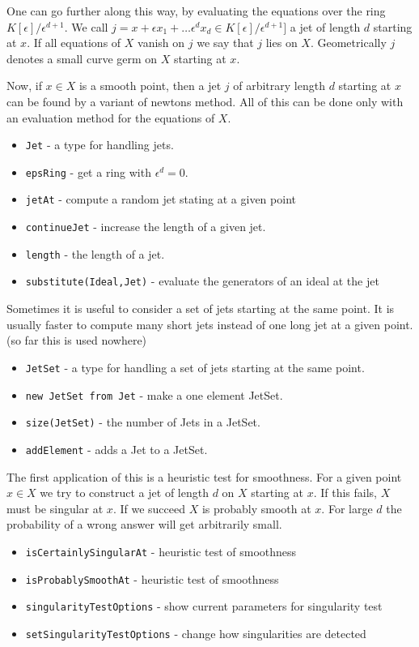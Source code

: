 \documentclass[12pt,a4paper]{amsart}
\theoremstyle{plain}
\theoremstyle{definition}
\begin{document}
One can go further along this way, by evaluating the equations over the ring $K[\epsilon]/\epsilon^{d+1}$. 
We call $j = x + \epsilon x_1 + \dots \epsilon^d x_d \in K[\epsilon]/\epsilon^{d+1}]$ a jet of length $d$ starting at $x$. 
If all equations of $X$ vanish on $j$ we say that $j$ lies on $X$. Geometrically $j$ denotes a small curve germ on $X$ starting at $x$.

Now, if $x \in X$ is a smooth point, then a jet $j$ of arbitrary length $d$ starting at $x$ can be found by a variant of newtons method. All of this can be done only with an evaluation method for the equations of $X$. 

\begin{itemize}
\item {\tt Jet} - a type for handling jets.
\item {\tt epsRing} - get a ring with $\epsilon^d = 0$.
\item {\tt jetAt} - compute a random jet stating at a given point
\item {\tt continueJet} - increase the length of a given jet.
\item {\tt length} - the length of a jet.
\item {\tt substitute(Ideal,Jet)} - evaluate the generators of an ideal at the jet
\end{itemize}

Sometimes it is useful to consider a set of jets starting at the same point. It is usually faster to compute many short jets instead of one long jet at a given point. {\color{red} (so far this is used nowhere)}

\begin{itemize}
\item {\tt JetSet} - a type for handling a set of jets starting at the same point.
\item {\tt new JetSet from Jet} - make a one element JetSet.
\item {\tt size(JetSet)} - the number of Jets in a JetSet.
\item {\tt addElement} - adds a Jet to a JetSet.
\end{itemize}

The first application of this is a heuristic test for smoothness. For a given point $x \in X$ we try to construct a jet of length $d$ on $X$ starting at $x$. If this fails, $X$ must be singular at $x$. If we succeed $X$ is probably smooth at $x$. For large $d$ the probability of a wrong answer will get arbitrarily small. 

\begin{itemize}
\item {\tt isCertainlySingularAt} - heuristic test of smoothness
\item {\tt isProbablySmoothAt} - heuristic test of smoothness
\item {\tt singularityTestOptions} - show current parameters for singularity test
\item {\tt setSingularityTestOptions} - change how singularities are detected
\end{itemize}
\end{document}
